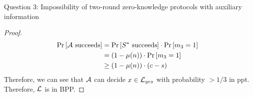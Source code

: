 \begin{solution}{Question 3: Impossibility of two-round zero-knowledge protocols with auxiliary information}
\begin{proof}
        \begin{equation}
            \begin{split}
                \Pr\left[ \mathcal{A}\text{ succeeds} \right] &= \Pr\left[ S^*\text{ succeeds} \right]\cdot \Pr\left[ m_3 = 1 \right]\\
                                             &= (1 - \mu(n))\cdot \Pr\left[ m_3 = 1 \right]\\
                                             &\geq (1 - \mu(n))\cdot (c - s)
            \end{split}
        \end{equation}
        Therefore, we can see that $\mathcal{A}$ can decide $x \in \mathcal{L}_{yes}$ with probability $ > 1/3$ in ppt. Therefore, $\mathcal{L}$ is in BPP.
    \end{proof}
\end{solution}
